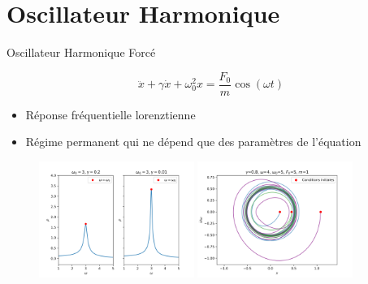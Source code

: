 \section{Oscillateur Harmonique}
\begin{frame}{Oscillateur Harmonique Forcé}

    $$ \ddot{x} + \gamma\dot{x} + \omega_0^2 x = \frac{F_0}{m}\cos(\omega t) $$

    \begin{itemize}
        \item Réponse fréquentielle lorenztienne
        \item Régime permanent qui ne dépend que des paramètres de l'équation
    \end{itemize}
    

        \begin{figure}
            \includegraphics[width=0.45\textwidth]{images/harmonique/rho_plot_contrast.png}
            \includegraphics[width=0.45\textwidth]{images/harmonique/ho_triple_phase_plot_x0=0.532808128684573_v0=0_gamma=0.8_w0=5_w=4_f0=5.png}
        \end{figure}
    
\end{frame}

